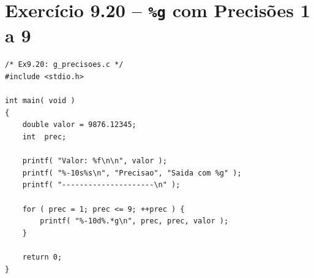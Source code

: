 \documentclass[12pt,a4paper]{article}
\begin{document}
\newpage

\section{Exercício 9.20 -- \texttt{\%g} com Precisões 1 a 9}

\begin{respostabox}
\begin{lstlisting}
/* Ex9.20: g_precisoes.c */
#include <stdio.h>

int main( void )
{
    double valor = 9876.12345;
    int  prec;

    printf( "Valor: %f\n\n", valor );
    printf( "%-10s%s\n", "Precisao", "Saida com %g" );
    printf( "---------------------\n" );

    for ( prec = 1; prec <= 9; ++prec ) {
        printf( "%-10d%.*g\n", prec, prec, valor );
    }

    return 0;
}
\end{lstlisting}


\end{respostabox}
\end{document}
